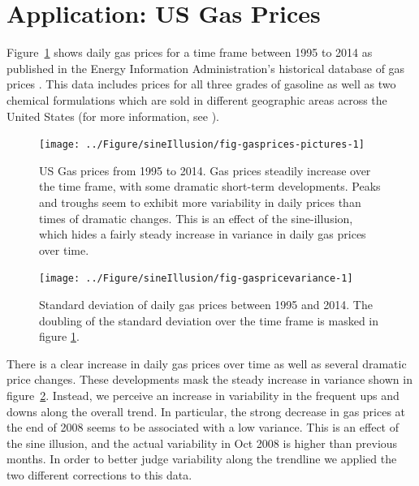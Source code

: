 \documentclass[11pt]{isuthesis}\usepackage[]{graphicx}\usepackage[]{color}
\newenvironment{knitrout}{}{} %
\begin{document}
\section{Application: US Gas Prices}
Figure~\ref{fig:gasprices} shows daily gas prices for a time frame between 1995 to 2014 as published in the Energy Information Administration's historical database of gas prices \citep{EIA}. This data includes prices for all three grades of gasoline as well as two chemical formulations which are sold in different geographic areas across the United States (for more information, see \citep{EIA-reformulated}). 

\begin{figure}[h!tbp]
\begin{knitrout}
\color{fgcolor}

{\centering \texttt{[image: ../Figure/sineIllusion/fig-gasprices-pictures-1]} 

}



\end{knitrout}
\caption[US Gas prices from 1995 to 2014]{US Gas prices from 1995 to 2014. Gas prices steadily increase over the time frame, with some dramatic short-term developments. Peaks and troughs seem to exhibit more variability in daily prices than times of dramatic changes. This is an effect of the sine-illusion, which hides a fairly steady increase in variance in daily gas prices over time.}\label{fig:gasprices}
\end{figure}
\begin{figure}\centering
\begin{knitrout}
\color{fgcolor}

{\centering \texttt{[image: ../Figure/sineIllusion/fig-gaspricevariance-1]} 

}



\end{knitrout}
\caption[Standard deviation of daily gas prices between 1995 and 2014. ]{Standard deviation of daily gas prices between 1995 and 2014. The doubling of the standard deviation over the time frame is masked in figure \ref{fig:gasprices}.\label{fig:gasvariance}}
\end{figure}
There is a clear increase in daily gas prices over time as well as several dramatic price changes. These developments mask the steady increase in variance shown in figure~\ref{fig:gasvariance}. Instead, we perceive an increase in variability in the frequent ups and downs along the overall trend. In particular, the strong decrease in gas prices at the end of 2008 seems to be associated with a low variance. This is an effect of the sine illusion, and the actual variability in Oct 2008 is higher than previous months. In order to better judge variability along the trendline we applied the two different corrections to this data. 
\end{document}
